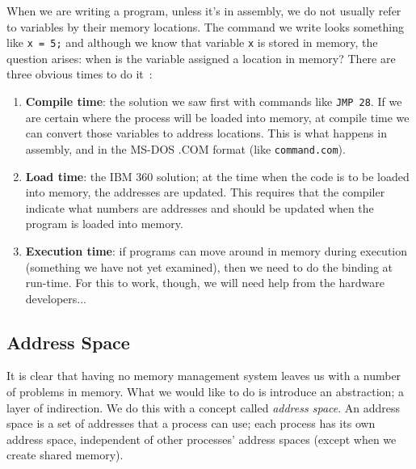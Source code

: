 When we are writing a program, unless it's in assembly, we do not usually refer to variables by their memory locations. The command we write looks something like \texttt{x = 5;} and although we know that variable \texttt{x} is stored in memory, the question arises: when is the variable assigned a location in memory? There are three obvious times to do it~\cite{osc}:

\begin{enumerate}
	\item \textbf{Compile time}: the solution we saw first with commands like \texttt{JMP 28}. If we are certain where the process will be loaded into memory, at compile time we can convert those variables to address locations. This is what happens in assembly, and in the MS-DOS .COM format (like \texttt{command.com}).
	\item \textbf{Load time}: the IBM 360 solution; at the time when the code is to be loaded into memory, the addresses are updated. This requires that the compiler indicate what numbers are addresses and should be updated when the program is loaded into memory.
	\item \textbf{Execution time}: if programs can move around in memory during execution (something we have not yet examined), then we need to do the binding at run-time. For this to work, though, we will need help from the hardware developers...
\end{enumerate}

\subsection*{Address Space}
It is clear that having no memory management system leaves us with a number of problems in memory. What we would like to do is introduce an abstraction; a layer of indirection. We do this with a concept called \textit{address space}. An address space is a set of addresses that a process can use; each process has its own address space, independent of other processes' address spaces (except when we create shared memory).


